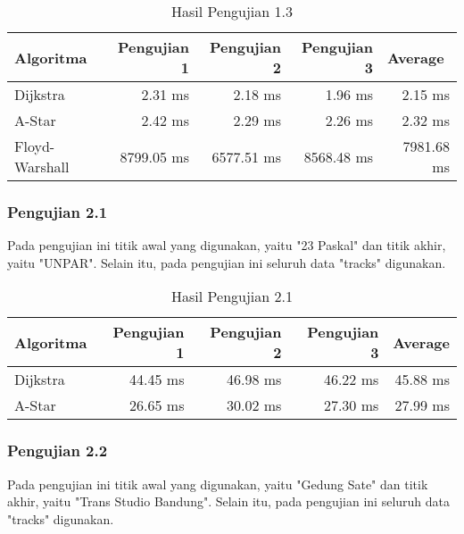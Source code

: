 \begin{table}[H]
\centering
\caption{Hasil Pengujian 1.3}
\label{tab:hasiluji1.3}
{\large
\begin{tabular}{|l|r|r|r|r|}
\hline
\textbf{Algoritma} & \textbf{Pengujian 1} & \textbf{Pengujian 2} & \textbf{Pengujian 3} & \multicolumn{1}{l|}{\textbf{Average}}\\ \hline
Dijkstra           & 2.31 ms              & 2.18 ms             & 1.96 ms      &    2.15 ms           \\ \hline
A-Star            & 2.42 ms              & 2.29 ms              & 2.26 ms      &    2.32 ms        \\ \hline
Floyd-Warshall     & 8799.05 ms              & 6577.51 ms               & 8568.48 ms      &     7981.68 ms        \\ \hline
\end{tabular}
}
\end{table}

\subsubsection{Pengujian 2.1}
Pada pengujian ini titik awal yang digunakan, yaitu "23 Paskal" dan titik akhir, yaitu "UNPAR". Selain itu, pada pengujian ini seluruh data "tracks" digunakan.

\begin{table}[H]
\centering
\caption{Hasil Pengujian 2.1}
\label{tab:hasiluji2.1}
{\large
\begin{tabular}{|l|r|r|r|r|}
\hline
\textbf{Algoritma} & \textbf{Pengujian 1} & \textbf{Pengujian 2} & \textbf{Pengujian 3} & {\textbf{Average}}\\ \hline
Dijkstra           & 44.45 ms              & 46.98 ms             & 46.22 ms     &      45.88 ms         \\ \hline
A-Star            & 26.65 ms              & 30.02 ms              & 27.30 ms      &      27.99 ms        \\ \hline
\end{tabular}
}
\end{table}

\subsubsection{Pengujian 2.2}
Pada pengujian ini titik awal yang digunakan, yaitu "Gedung Sate" dan titik akhir, yaitu "Trans Studio Bandung". Selain itu, pada pengujian ini seluruh data "tracks" digunakan.

